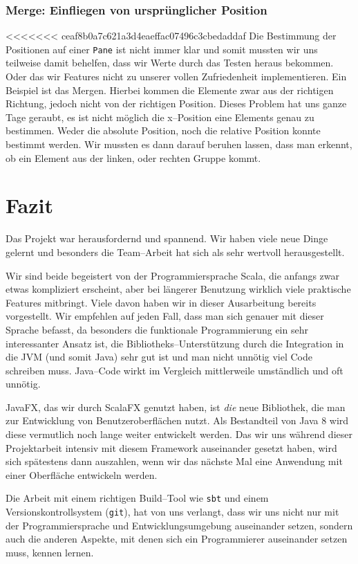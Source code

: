 \subsubsection{Merge: Einfliegen von ursprünglicher Position}
<<<<<<< ceaf8b0a7c621a3d4eaeffac07496c3cbedaddaf
Die Bestimmung der Positionen auf einer \texttt{Pane} ist nicht immer klar und somit mussten wir uns teilweise damit behelfen, dass wir Werte durch das Testen heraus bekommen. Oder das wir Features nicht zu unserer vollen Zufriedenheit implementieren. Ein Beispiel ist das Mergen. Hierbei kommen die Elemente zwar aus der richtigen Richtung, jedoch nicht von der richtigen Position. Dieses Problem hat uns ganze Tage geraubt, es ist nicht möglich die x--Position eine Elements genau zu bestimmen. Weder die absolute Position, noch die relative Position konnte bestimmt werden. Wir mussten es dann darauf beruhen lassen, dass man erkennt, ob ein Element aus der linken, oder rechten Gruppe kommt.

\section{Fazit}\label{sec:fazit}
Das Projekt war herausfordernd und spannend. Wir haben viele neue Dinge gelernt und besonders die Team--Arbeit hat sich als sehr wertvoll herausgestellt.

Wir sind beide begeistert von der Programmiersprache Scala, die anfangs zwar etwas kompliziert erscheint, aber bei längerer Benutzung wirklich viele praktische Features mitbringt. Viele davon haben wir in dieser Ausarbeitung bereits vorgestellt. Wir empfehlen auf jeden Fall, dass man sich genauer mit dieser Sprache befasst, da besonders die funktionale Programmierung ein sehr interessanter Ansatz ist, die Bibliotheks--Unterstützung durch die Integration in die JVM (und somit Java) sehr gut ist und man nicht unnötig viel Code schreiben muss. Java--Code wirkt im Vergleich mittlerweile umständlich und oft unnötig.

JavaFX, das wir durch ScalaFX genutzt haben, ist \textit{die} neue Bibliothek, die man zur Entwicklung von Benutzeroberflächen nutzt. Als Bestandteil von Java 8 wird diese vermutlich noch lange weiter entwickelt werden. Das wir uns während dieser Projektarbeit intensiv mit diesem Framework auseinander gesetzt haben, wird sich spätestens dann auszahlen, wenn wir das nächste Mal eine Anwendung mit einer Oberfläche entwickeln werden.

Die Arbeit mit einem richtigen Build--Tool wie \texttt{sbt} und einem Versionskontrollsystem (\texttt{git}), hat von uns verlangt, dass wir uns nicht nur mit der Programmiersprache und Entwicklungsumgebung auseinander setzen, sondern auch die anderen Aspekte, mit denen sich ein Programmierer auseinander setzen muss, kennen lernen.

